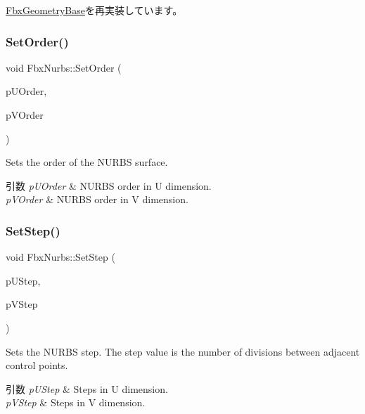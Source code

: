 \hyperlink{class_fbx_geometry_base_ab2d5567b073e6b9f4feb5bb428fa99e4}{Fbx\+Geometry\+Base}を再実装しています。

\mbox{\label{class_fbx_nurbs_a50b478b4c7feab9bf41b805f9893c598}} 
\subsubsection{\texorpdfstring{Set\+Order()}{SetOrder()}}
{\footnotesize\ttfamily void Fbx\+Nurbs\+::\+Set\+Order (\begin{DoxyParamCaption}\item[{\hyperlink{fbxtypes_8h_ae9fb141d8158a730aa85ec5ff2ea3f6b}{Fbx\+U\+Int}}]{p\+U\+Order,  }\item[{\hyperlink{fbxtypes_8h_ae9fb141d8158a730aa85ec5ff2ea3f6b}{Fbx\+U\+Int}}]{p\+V\+Order }\end{DoxyParamCaption})}

Sets the order of the N\+U\+R\+BS surface. 
\begin{DoxyParams}{引数}
{\em p\+U\+Order} & N\+U\+R\+BS order in U dimension. \\
\hline
{\em p\+V\+Order} & N\+U\+R\+BS order in V dimension. \\
\hline
\end{DoxyParams}
\mbox{\label{class_fbx_nurbs_a4b60585e7190d50e95947ddfcafd39a7}} 
\subsubsection{\texorpdfstring{Set\+Step()}{SetStep()}}
{\footnotesize\ttfamily void Fbx\+Nurbs\+::\+Set\+Step (\begin{DoxyParamCaption}\item[{int}]{p\+U\+Step,  }\item[{int}]{p\+V\+Step }\end{DoxyParamCaption})}

Sets the N\+U\+R\+BS step. The step value is the number of divisions between adjacent control points. 
\begin{DoxyParams}{引数}
{\em p\+U\+Step} & Steps in U dimension. \\
\hline
{\em p\+V\+Step} & Steps in V dimension. \\
\hline
\end{DoxyParams}
\mbox{\label{class_fbx_nurbs_a6687f58ab39b07a3ce686992e5d8c9f8}} 
